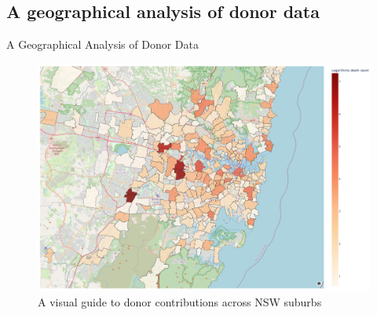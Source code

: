 \documentclass[]{beamer}
\begin{document}
	\subsection{A geographical analysis of donor data}

\begin{frame}[plain]{A Geographical Analysis of Donor Data}
	\begin{figure}
		\includegraphics[width=\textwidth]{img/choropleth_counts.png}
		\vspace{-1.5em}
		\caption{A visual guide to donor contributions across NSW suburbs}
	\end{figure}
\end{frame}

\end{document}
